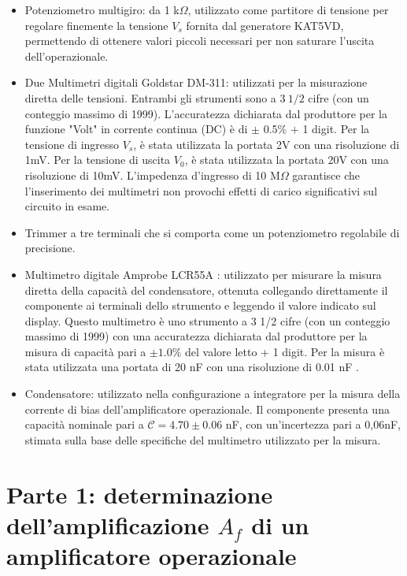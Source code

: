 \documentclass[a4paper, oneside]{article}
\begin{document}
\begin{itemize}
\item Potenziometro multigiro:
da 1 k$\Omega$, utilizzato come partitore di tensione per regolare finemente la tensione $V_s$ fornita
dal generatore KAT5VD, permettendo di ottenere valori piccoli necessari per non saturare l'uscita dell'operazionale.
\item Due Multimetri digitali Goldstar DM-311:
utilizzati per la misurazione diretta delle tensioni. Entrambi gli strumenti sono a $3 \ 1/2$ cifre
(con un conteggio massimo di 1999). L'accuratezza dichiarata dal produttore per la funzione "Volt"
in corrente continua (DC) è di $\pm$ 0.5\% $+$ 1 digit. Per la tensione di ingresso $V_s$, è stata
utilizzata la portata 2V con una risoluzione di 1mV. Per la tensione di uscita $V_0$, è stata
utilizzata la portata 20V con una risoluzione di 10mV.
L'impedenza d'ingresso di 10 M$\Omega$ garantisce che l'inserimento dei multimetri non provochi
effetti di carico significativi sul circuito in esame.
\item Trimmer a tre terminali che si comporta come un potenziometro regolabile di precisione.
\item Multimetro digitale Amprobe LCR55A : utilizzato per misurare la misura diretta della capacità del condensatore, ottenuta collegando direttamente il componente ai terminali dello strumento e leggendo il valore indicato sul display.  Questo multimetro è uno strumento a 3 1/2 cifre (con un conteggio massimo di 1999) con una accuratezza dichiarata dal produttore per la misura di capacità pari a $\pm 1.0\%$ del valore letto + 1 digit. Per la misura è stata utilizzata una portata di 20 nF con una risoluzione di 0.01 nF .
\item Condensatore: utilizzato nella configurazione a integratore per la misura della corrente di bias dell'amplificatore operazionale. Il componente presenta una capacità nominale pari a $\mathcal{C} = 4.70 \pm 0.06$ nF, con un'incertezza pari a 0,06nF, stimata sulla base delle specifiche del multimetro utilizzato per la misura.
\end{itemize}

\section{Parte 1: determinazione dell'amplificazione $A_f$ di un amplificatore operazionale}
\end{document}
